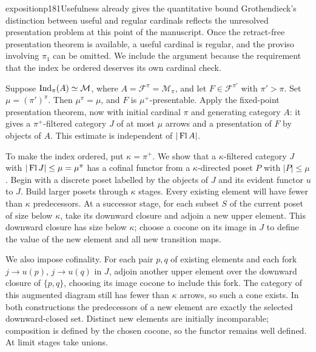 \begin{dcomment}{exposition}{p181}{Usefulness already gives the quantitative bound}
Grothendieck's distinction between useful and regular cardinals reflects the unresolved presentation problem at this point of the manuscript. Once the retract-free presentation theorem is available, a useful cardinal is regular, and the proviso involving $\pi_1$ can be omitted. We include the argument because the requirement that the index be ordered deserves its own cardinal check.

Suppose $\operatorname{Ind}_\pi(A)\simeq\mathcal M$, where $A=\mathcal F^\pi=\mathcal M_\pi$, and let $F\in\mathcal F^{\pi'}$ with $\pi'>\pi$. Set $\mu=(\pi')^\pi$. Then $\mu^\pi=\mu$, and $F$ is $\mu^+$-presentable. Apply the fixed-point presentation theorem, now with initial cardinal $\pi$ and generating category $A$: it gives a $\pi^+$-filtered category $J$ of at most $\mu$ arrows and a presentation of $F$ by objects of $A$. This estimate is independent of $|\operatorname{Fl} A|$.

To make the index ordered, put $\kappa=\pi^+$. We show that a $\kappa$-filtered category $J$ with $|\operatorname{Fl} J|\leq\mu=\mu^\pi$ has a cofinal functor from a $\kappa$-directed poset $P$ with $|P|\leq\mu$. Begin with a discrete poset labelled by the objects of $J$ and its evident functor $u$ to $J$. Build larger posets through $\kappa$ stages. Every existing element will have fewer than $\kappa$ predecessors. At a successor stage, for each subset $S$ of the current poset of size below $\kappa$, take its downward closure and adjoin a new upper element. This downward closure has size below $\kappa$; choose a cocone on its image in $J$ to define the value of the new element and all new transition maps.

We also impose cofinality. For each pair $p,q$ of existing elements and each fork $j\to u(p)$, $j\to u(q)$ in $J$, adjoin another upper element over the downward closure of $\{p,q\}$, choosing its image cocone to include this fork. The category of this augmented diagram still has fewer than $\kappa$ arrows, so such a cone exists. In both constructions the predecessors of a new element are exactly the selected downward-closed set. Distinct new elements are initially incomparable; composition is defined by the chosen cocone, so the functor remains well defined. At limit stages take unions.


\end{dcomment}
